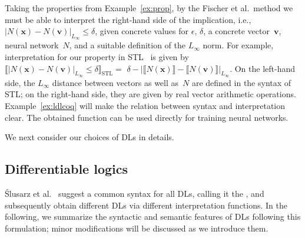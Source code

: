 \documentclass[a4paper,UKenglish,cleveref, autoref, thm-restate]{lipics-v2021}
\def\STL{\textrm{STL}}
\newcommand{\tempty}[1]{\llbracket #1 \rrbracket}
\newcommand{\vect}[1]{\mathbf{#1}}
\newcommand{\x}{\vect{x}} %
\newcommand{\ve}{\vect{v}} %
\begin{document}
\begin{example}\label{ex:loss}

Taking the properties from Example~\ref{ex:prop}, by the Fischer et al.\ method
we must be able to interpret the right-hand side of the implication, i.e.,
$| N(\x) - N(\ve)|_{L_{\infty}} \leq \delta$, %
given concrete values for $\epsilon$, $\delta$, 
a concrete vector~$\ve$, neural network~$N$, and a suitable definition of the 
$L_{\infty}$ norm.
%
For example, interpretation for our property in \STL{}~\cite{varnai} is given by
$
 \tempty{| N(\x) - N(\ve)|_{L_{\infty}} \leq \delta}_{\STL} = $
$\delta - |\tempty{N(\x)} - \tempty{N(\ve)}|_{L_{\infty}}$.
On the left-hand side, the $L_{\infty}$ distance between vectors as well as~$N$ are defined
in the syntax of \STL{}; on the right-hand side, they are given by real vector
arithmetic operations. Example~\ref{ex:ldlcoq} will make the relation between syntax and interpretation clear. 
The obtained function can be used directly for training neural networks.
\end{example}

We next consider our choices of DLs in details.
 
\subsection{Differentiable logics}
 
Ślusarz et al.~\cite{ldl} suggest a common syntax for all DLs, calling it
the , and 
subsequently obtain different DLs via different interpretation functions. 
In the following, we summarize the syntactic and semantic features of DLs following this formulation; 
minor modifications will be discussed as we introduce them.
\end{document}
